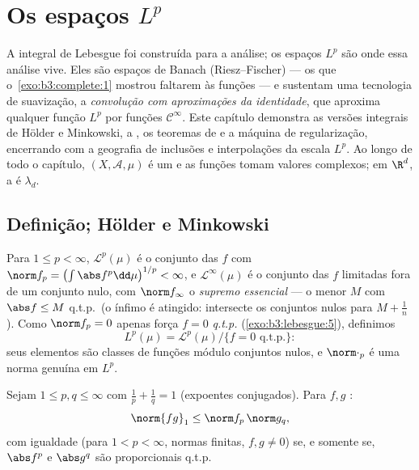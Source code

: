 \chapter{Os espaços \texorpdfstring{$L^p$}{Lp}}\label{ch:b3:lp}

A integral de Lebesgue foi construída para a análise; os espaços
$L^p$ são onde essa análise vive. Eles são espaços de Banach
(Riesz--Fischer) --- os  que o~\cref{exo:b3:complete:1} mostrou
faltarem às funções  --- e sustentam uma tecnologia de
suavização, a \emph{convolução com aproximações da identidade}, que
aproxima qualquer função $L^p$ por funções $\mathcal C^\infty$. Este capítulo
demonstra as versões integrais de Hölder e Minkowski, a , os
teoremas de  e a máquina de regularização, encerrando com a
geografia de inclusões e interpolações da escala $L^p$. Ao longo de
todo o capítulo, $(X, \mathcal A, \mu)$ é um  e as funções tomam valores
complexos; em $\R^d$, a  é $\lambda_d$.

\section{Definição; Hölder e Minkowski}

\begin{definition}\label{def:b3:lp:space}
Para $1 \leq p < \infty$, $\mathcal L^p(\mu)$ é o conjunto das  $f$ com $\norm f_p = \bigl(\int\abs
f^p\dd\mu\bigr)^{1/p} < \infty$, e
$\mathcal L^\infty(\mu)$ é o conjunto das $f$ limitadas fora de um conjunto nulo, com
$\norm
f_\infty$ o \emph{supremo essencial} --- o menor $M$ com $\abs f \leq M$ q.t.p.\ (o
ínfimo é atingido: intersecte os conjuntos nulos para $M + \frac1n$). Como $\norm f_p = 0$
apenas força $f
= 0$ \emph{q.t.p.} (\cref{exo:b3:lebesgue:5}), definimos
\[
L^p(\mu) = \mathcal L^p(\mu)/\{f = 0 \text{ q.t.p.}\} :
\]
seus elementos são classes de funções módulo conjuntos nulos, e $\norm\cdot_p$ é
uma norma genuína em $L^p$.
\end{definition}

\begin{theorem}\label{thm:b3:lp:holder}
Sejam $1 \leq p, q \leq \infty$ com $\frac1p + \frac1q = 1$ (expoentes conjugados). Para $f, g$
:
\[
\norm{fg}_1 \leq \norm f_p\,\norm g_q ,
\]
com igualdade (para $1 < p < \infty$, normas finitas, $f,g\ne0$) se, e somente se, $\abs f^p$ e
$\abs g^q$ são proporcionais q.t.p.
\end{theorem}

